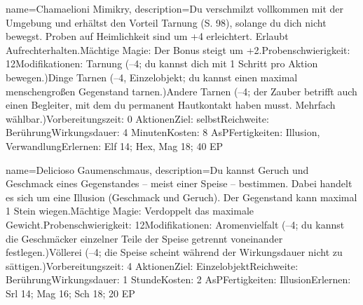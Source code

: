 {
    name={Chamaelioni Mimikry},
    description={Du verschmilzt vollkommen mit der Umgebung und erhältst den Vorteil Tarnung (S. 98), solange du dich nicht bewegst. Proben auf Heimlichkeit sind um +4 erleichtert. Erlaubt Aufrechterhalten.\newline Mächtige Magie: Der Bonus steigt um +2.\newline Probenschwierigkeit: 12\newline Modifikationen: Tarnung (–4; du kannst dich mit 1 Schritt pro Aktion bewegen.)\newline Dinge Tarnen (–4, Einzelobjekt; du kannst einen maximal menschengroßen Gegenstand tarnen.)\newline Andere Tarnen (–4; der Zauber betrifft auch einen Begleiter, mit dem du permanent Hautkontakt haben musst. Mehrfach wählbar.)\newline Vorbereitungszeit: 0 Aktionen\newline Ziel: selbst\newline Reichweite: Berührung\newline Wirkungsdauer: 4 Minuten\newline Kosten: 8 AsP\newline Fertigkeiten: Illusion, Verwandlung\newline Erlernen: Elf 14; Hex, Mag 18; 40 EP}
}


{
    name={Delicioso Gaumenschmaus},
    description={Du kannst Geruch und Geschmack eines Gegenstandes – meist einer Speise – bestimmen. Dabei handelt es sich um eine Illusion (Geschmack und Geruch). Der Gegenstand kann maximal 1 Stein wiegen.\newline Mächtige Magie: Verdoppelt das maximale Gewicht.\newline Probenschwierigkeit: 12\newline Modifikationen: Aromenvielfalt (–4; du kannst die Geschmäcker einzelner Teile der Speise getrennt voneinander festlegen.)\newline Völlerei (–4; die Speise scheint während der Wirkungsdauer nicht zu sättigen.)\newline Vorbereitungszeit: 4 Aktionen\newline Ziel: Einzelobjekt\newline Reichweite: Berührung\newline Wirkungsdauer: 1 Stunde\newline Kosten: 2 AsP\newline Fertigkeiten: Illusion\newline Erlernen: Srl 14; Mag 16; Sch 18; 20 EP}
}



